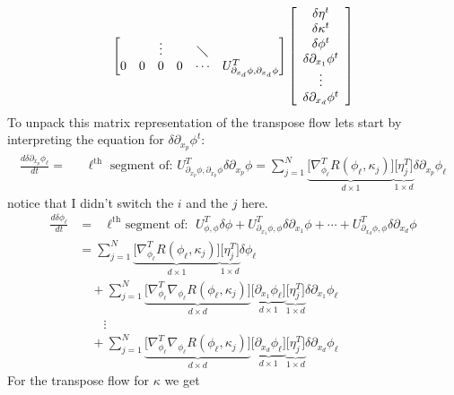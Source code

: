 \documentclass[noinfoline]{imsart}
\begin{document}
{\begin{equation}
\begin{bmatrix}
&&\vdots & &\diagdown& \\
0 & 0 &0 & 0 & \cdots  & U_{\partial_{x_d} \phi,\partial_{x_d} \phi} ^T
\end{bmatrix}
  \left[\begin{array}{c} \delta\eta^t\\ \delta \kappa^t \\ \delta\phi^t \\ \delta\partial_{x_1} \phi^t \\ \vdots \\ \delta\partial_{x_d} \phi^t \end{array}\right]
\end{equation}
To unpack this matrix representation of the transpose flow lets start by interpreting the equation for $\delta\partial_{x_p} \phi^t$:
\begin{align}
\frac{d\delta\partial_{x_p}\phi_\ell}{dt} 
=&   \text{ $\ell^{\text{th}}$ segment of: $U_{\partial_{x_p} \phi,\partial_{x_p} \phi} ^T\delta\partial_{x_p}\phi$}
= \sum_{j=1}^N \underbrace{\bigl[ \nabla^T_{\phi_\ell}R(\phi_\ell,\kappa_j)\bigr]}_{d\times 1} \underbrace{\bigl[\eta_j^T\bigr]}_{1\times d}  \delta\partial_{x_p} {\phi}_\ell
\end{align}
notice that I didn't switch the $i$ and the $j$ here.
\begin{align}
\frac{d\delta\phi_\ell}{dt} &= \text{ $\ell^{\text{th}}$ segment of: } U_{\phi,\phi}^T\delta\phi  + U_{\partial_{x_1} \phi,\phi}^T\delta\partial_{x_1} \phi + \cdots  +  U_{\partial_{x_d} \phi,\phi}^T\delta\partial_{x_d} \phi \\
&=  \sum_{j=1}^N  \underbrace{\bigl[ \nabla^T_{\phi_\ell}R(\phi_\ell,\kappa_j)\bigr]}_{d\times 1}\underbrace{\bigl[\eta_j^T\bigr]}_{1\times d} \delta\phi_\ell \\
&\quad+\sum_{j=1}^N \underbrace{\bigl[\nabla_{\phi_\ell}^T\nabla_{\phi_\ell}R(\phi_\ell,\kappa_j)\bigr]}_{d\times d} \underbrace{\bigl[\partial_{x_1} {\phi_\ell}\bigr]}_{d\times 1} \underbrace{\bigl[ \eta_j^T\bigr]}_{1\times d} \delta\partial_{x_1} \phi_\ell \\
 &\qquad\vdots \nonumber\\ 
 &\quad+ \sum_{j=1}^N \underbrace{\bigl[\nabla_{\phi_\ell}^T\nabla_{\phi_\ell}R(\phi_\ell,\kappa_j)\bigr]}_{d\times d} \underbrace{\bigl[\partial_{x_d} {\phi_\ell}\bigr]}_{d\times 1} \underbrace{\bigl[ \eta_j^T\bigr]}_{1\times d} \delta \partial_{x_d}  \phi_\ell
\end{align}
For the transpose flow for $\kappa$ we get
\begin{align}

\end{align}}
\end{document}
